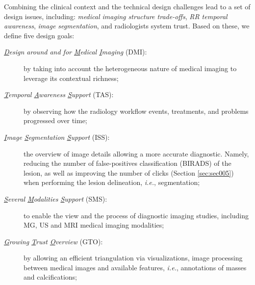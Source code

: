 Combining the clinical context and the technical design challenges lead to a set of design issues, including: \textit{medical imaging structure trade-offs}, \textit{RR temporal awareness}, \textit{image segmentation}, and radiologists system trust.
Based on these, we define five design goals:
\begin{description}
\item[{\it \underline{D}esign around and for \underline{M}edical \underline{I}maging} (DMI):] by taking into account the heterogeneous nature of medical imaging to leverage its contextual richness;
\item[{\it \underline{T}emporal \underline{A}wareness \underline{S}upport} (TAS):] by observing how the radiology workflow events, treatments, and problems progressed over time;
\item[{\it \underline{I}mage \underline{S}egmentation \underline{S}upport} (ISS):] the overview of image details allowing a more accurate diagnostic. Namely, reducing the number of false-positives classification (BIRADS) of the lesion, as well as improving the number of clicks (Section \ref{sec:sec005}) when performing the lesion delineation, {\em i.e.}, segmentation;
\item[{\it\underline{S}everal \underline{M}odalities \underline{S}upport} (SMS):] to enable the view and the process of diagnostic imaging studies, including MG, US and MRI medical imaging modalities;
\item[{\it\underline{G}rowing \underline{T}rust \underline{O}verview} (GTO):] by allowing an efficient triangulation via visualizations, image processing between medical images and available features, {\em i.e.}, annotations of masses and calcifications;
\end{description}
